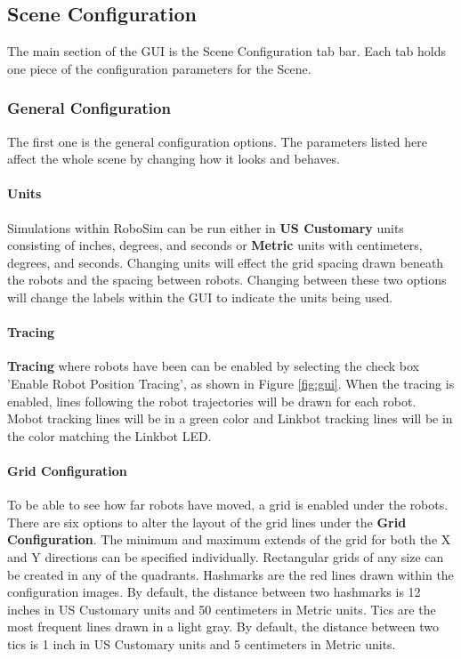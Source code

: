 \documentclass{article}
\begin{document}
\subsection{Scene Configuration}
The main section of the GUI is the Scene Configuration tab bar.  Each tab
holds one piece of the configuration parameters for the Scene.

\subsubsection{General Configuration}
The first one is the general configuration options.  The parameters listed here
affect the whole scene by changing how it looks and behaves.

\paragraph{Units}
Simulations within RoboSim can be run either in {\bf US Customary} units
consisting of inches, degrees, and seconds or {\bf Metric} units with
centimeters, degrees, and seconds.  Changing units will effect the grid spacing
drawn beneath the robots and the spacing between robots.  Changing between these
two options will change the labels within the GUI to indicate the units being
used.

\paragraph{Tracing}
{\bf Tracing} where robots have been can be enabled by selecting the check box
'Enable Robot Position Tracing', as shown in Figure \ref{fig:gui}.  When the
tracing is enabled, lines following the robot trajectories will be drawn for
each robot.  Mobot tracking lines will be in a green color and Linkbot tracking
lines will be in the color matching the Linkbot LED.

\paragraph{Grid Configuration}
To be able to see how far robots have moved, a grid is enabled under the robots.
There are six options to alter the layout of the grid lines under the {\bf Grid
Configuration}.  The minimum and maximum extends of the grid for both the X and
Y directions can be specified individually.  Rectangular grids of any size can
be created in any of the quadrants.  Hashmarks are the red lines drawn within
the configuration images.  By default, the distance between two hashmarks is 12
inches in US Customary units and 50 centimeters in Metric units.  Tics are the
most frequent lines drawn in a light gray.  By default, the distance between two
tics is 1 inch in US Customary units and 5 centimeters in Metric units.
\end{document}
